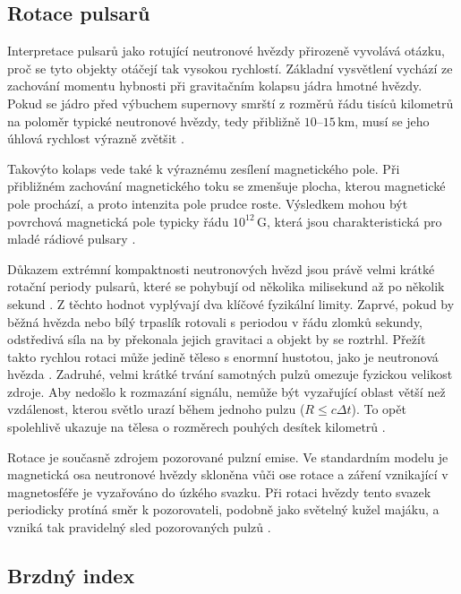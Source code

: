 \documentclass[%
final%
,htext%
]{ipothes}
\begin{document}
\subsection{Rotace pulsarů}

Interpretace pulsarů jako rotující neutronové hvězdy přirozeně vyvolává otázku, proč se tyto objekty otáčejí tak vysokou rychlostí. Základní vysvětlení vychází ze zachování momentu hybnosti při gravitačním kolapsu jádra hmotné hvězdy. Pokud se jádro před výbuchem supernovy smrští z rozměrů řádu tisíců kilometrů na poloměr typické neutronové hvězdy, tedy přibližně $10$--$15\,\mathrm{km}$, musí se jeho úhlová rychlost výrazně zvětšit \cite{ghosh2007}.

Takovýto kolaps vede také k výraznému zesílení magnetického pole. Při přibližném zachování magnetického toku se zmenšuje plocha, kterou magnetické pole prochází, a proto intenzita pole prudce roste. Výsledkem mohou být povrchová magnetická pole typicky řádu $10^{12}\,\mathrm{G}$, která jsou charakteristická pro mladé rádiové pulsary \cite{ghosh2007}.

Důkazem extrémní kompaktnosti neutronových hvězd jsou právě velmi krátké rotační periody pulsarů, které se pohybují od několika milisekund až po několik sekund \cite{ghosh2007}. Z těchto hodnot vyplývají dva klíčové fyzikální limity. Zaprvé, pokud by běžná hvězda nebo bílý trpaslík rotovali s periodou v řádu zlomků sekundy, odstředivá síla na by překonala jejich gravitaci a objekt by se roztrhl. Přežít takto rychlou rotaci může jedině těleso s enormní hustotou, jako je neutronová hvězda \cite{ghosh2007}. Zadruhé, velmi krátké trvání samotných pulzů omezuje fyzickou velikost zdroje. Aby nedošlo k rozmazání signálu, nemůže být vyzařující oblast větší než vzdálenost, kterou světlo urazí během jednoho pulzu ($R \le c \Delta t$). To opět spolehlivě ukazuje na tělesa o rozměrech pouhých desítek kilometrů \cite{ghosh2007}.

Rotace je současně zdrojem pozorované pulzní emise. Ve standardním modelu je magnetická osa neutronové hvězdy skloněna vůči ose rotace a záření vznikající v magnetosféře je vyzařováno do úzkého svazku. Při rotaci hvězdy tento svazek periodicky protíná směr k pozorovateli, podobně jako světelný kužel majáku, a vzniká tak pravidelný sled pozorovaných pulzů \cite{ghosh2007}.


\subsection{Brzdný index}
\end{document}
